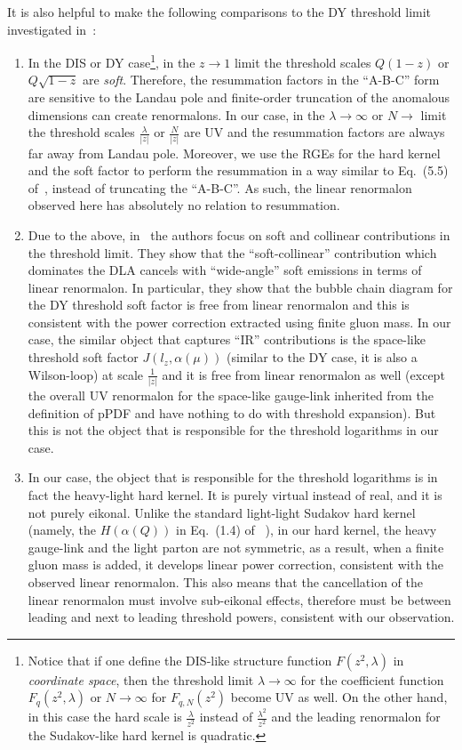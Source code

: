 \documentclass[a4paper,11pt]{article}
\begin{document}
It is also helpful to make the following comparisons to the DY threshold limit investigated in~\cite{Beneke:1995pq}:
\begin{enumerate}
    \item In the DIS or DY case\footnote{Notice that if one define the DIS-like structure function $F(z^2,\lambda)$ in {\it coordinate space}, then the threshold limit $\lambda \rightarrow \infty$ for the coefficient function $F_q(z^2,\lambda)$ or $N\rightarrow \infty$ for $F_{q,N}(z^2)$ become UV as well. On the other hand, in this case the hard scale is $\frac{\lambda}{z^2}$ instead of $\frac{\lambda^2}{z^2}$ and the leading renormalon for the Sudakov-like hard kernel is quadratic.}, in the $z \rightarrow 1$ limit the threshold scales $Q(1-z)$ or $Q\sqrt{1-z}$ are {\it soft}. Therefore, the resummation factors in the ``A-B-C'' form are sensitive to the Landau pole and finite-order truncation of the anomalous dimensions can create renormalons. In our case, in the $\lambda \rightarrow \infty$ or $N \rightarrow$ limit the threshold scales $\frac{\lambda}{|z|}$ or $\frac{N}{|z|}$ are UV and the resummation factors are always far away from Landau pole. Moreover, we use the RGEs for the hard kernel and the soft factor to perform the resummation in a way similar to Eq.~(5.5) of~\cite{Beneke:1995pq},  instead of truncating the ``A-B-C''.  As such, the linear renormalon observed here has absolutely no relation to resummation. 
    \item Due to the above, in~\cite{Beneke:1995pq} the authors focus on soft and collinear contributions in the threshold limit. They show that the ``soft-collinear'' contribution which dominates the DLA cancels with ``wide-angle'' soft emissions in terms of linear renormalon. In particular, they show that the bubble chain diagram for the DY threshold soft factor is free from linear renormalon and this is consistent with the power correction extracted using finite gluon mass. In our case, the similar object that captures ``IR'' contributions is the space-like threshold soft factor $J(l_z,\alpha(\mu))$ (similar to the DY case, it is also a Wilson-loop) at scale $\frac{1}{|z|}$ and it is free from linear renormalon as well (except the overall UV renormalon for the space-like gauge-link inherited from the definition of pPDF and have nothing to do with threshold expansion). But this is not the object that is responsible for the threshold logarithms in our case.
    \item In our case, the object that is responsible for the threshold logarithms is in fact the heavy-light hard  kernel. It is purely virtual instead of real, and it is not purely eikonal. Unlike the standard light-light Sudakov hard kernel (namely, the $H(\alpha(Q))$ in Eq.~(1.4) of~\cite{Beneke:1995pq} ), in our hard kernel, the heavy gauge-link and the light parton are not symmetric, as a result, when a finite gluon mass is added, it develops linear power correction, consistent with the observed linear renormalon. This also means that the cancellation of the linear renormalon must involve sub-eikonal effects, therefore must be between leading and next to leading threshold powers, consistent with our observation.  
\end{enumerate}
\end{document}

